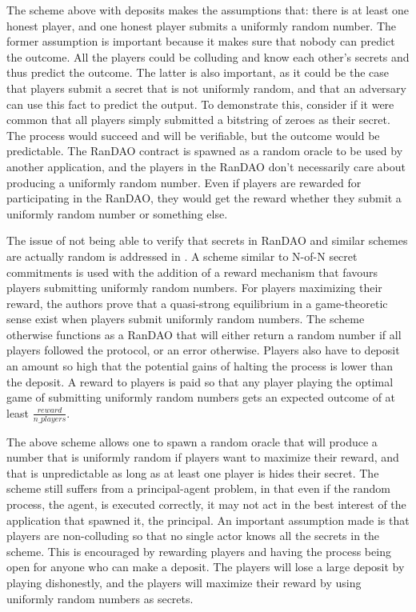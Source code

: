 The scheme above with deposits makes the assumptions that: there is at least one honest player, and one honest player submits a uniformly random number. The former assumption is important because it makes sure that nobody can predict the outcome. All the players could be colluding and know each other's secrets and thus predict the outcome. The latter is also important, as it could be the case that players submit a secret that is not uniformly random, and that an adversary can use this fact to predict the output. To demonstrate this, consider if it were common that all players simply submitted a bitstring of zeroes as their secret. The process would succeed and will be verifiable, but the outcome would be predictable. The RanDAO contract is spawned as a random oracle to be used by another application, and the players in the RanDAO don't necessarily care about producing a uniformly random number. Even if players are rewarded for participating in the RanDAO, they would get the reward whether they submit a uniformly random number or something else.

The issue of not being able to verify that secrets in RanDAO and similar schemes are actually random is addressed in \cite{chatterjee_probabilistic_2019}. A scheme similar to N-of-N secret commitments is used with the addition of a reward mechanism that favours players submitting uniformly random numbers. For players maximizing their reward, the authors prove that a quasi-strong equilibrium in a game-theoretic sense exist when players submit uniformly random numbers. The scheme otherwise functions as a RanDAO that will either return a random number if all players followed the protocol, or an error otherwise. Players also have to deposit an amount so high that the potential gains of halting the process is lower than the deposit. A reward to players is paid so that any player playing the optimal game of submitting uniformly random numbers gets an expected outcome of at least $\frac{reward}{n\_players}$. 

The above scheme allows one to spawn a random oracle that will produce a number that is uniformly random if players want to maximize their reward, and that is unpredictable as long as at least one player is hides their secret. The scheme still suffers from a principal-agent problem, in that even if the random process, the agent, is executed correctly, it may not act in the best interest of the application that spawned it, the principal. An important assumption made is that players are non-colluding so that no single actor knows all the secrets in the scheme. This is encouraged by rewarding players and having the process being open for anyone who can make a deposit. The players will lose a large deposit by playing dishonestly, and the players will maximize their reward by using uniformly random numbers as secrets.

